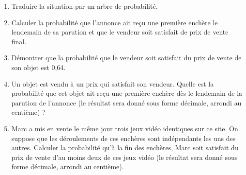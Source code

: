 \begin{enumerate}
     \item
     Traduire la situation par un arbre de probabilité.
     \item
     Calculer la probabilité que l'annonce ait reçu une première enchère le lendemain de sa parution et que le vendeur soit satisfait de prix de vente final.
     \item
     Démontrer que la probabilité que le vendeur soit satisfait du prix de vente de son objet est 0,64.
     \item
     Un objet est vendu à un prix qui satisfait son vendeur. Quelle est la probabilité que cet objet ait reçu une première enchère dès le lendemain de la parution de l'annonce (le résultat sera donné sous forme décimale, arrondi au centième) ?
     \item
Marc a mis en vente le même jour trois jeux vidéo identiques sur ce site. On suppose que les déroulements de ces enchères sont indépendants les uns des autres. Calculer la probabilité qu'à la fin des enchères, Marc soit satisfait du prix de vente d'au moins deux de ces jeux vidéo (le résultat sera donné sous forme décimale, arrondi au centième).\end{enumerate}
\begin{corrige}

\end{corrige}

